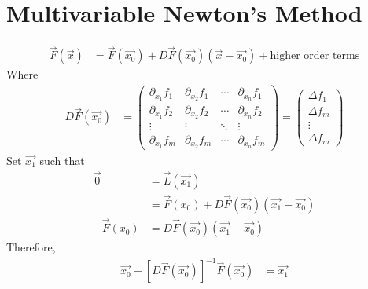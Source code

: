\documentclass[11pt,oneside]{book}
\theoremstyle{break}
\theoremstyle{break}
\begin{document}
\section[Multivariable Newton's Method]{Multivariable  Newton's Method}
\begin{align*}
\vec{F}(\vec{x})&=\vec{F}(\vec{x_0})+D\vec{F}(\vec{x_0})(\vec{x}-\vec{x_0})+\text{higher order terms}
\end{align*}
Where \begin{align*}
D\vec{F}(\vec{x_0})&=\begin{pmatrix}
\partial_{x_1}f_1& \partial_{x_2}f_1&\cdots &\partial_{x_n}f_1\\
\partial_{x_1}f_2& \partial_{x_2}f_2&\cdots &\partial_{x_n}f_2\\
\vdots &\vdots &\ddots &\vdots\\
\partial_{x_1}f_m& \partial_{x_2}f_m&\cdots &\partial_{x_n}f_m
\end{pmatrix}=\begin{pmatrix}
\Delta f_1\\
\Delta f_m\\
\vdots\\
\Delta f_m
\end{pmatrix}
\end{align*}
Set $\vec{x_1}$ such that \begin{align*}
\vec{0}&=\vec{L}(\vec{x_1})\\
&=\vec{F}(x_0)+D\vec{F}(\vec{x_0})(\vec{x_1}-\vec{x_0})\\
-\vec{F}(x_0)&=D\vec{F}(\vec{x_0})(\vec{x_1}-\vec{x_0})
\end{align*}
Therefore, \begin{align*}
\vec{x_0}-[D\vec{F}(\vec{x_0})]^{-1}\vec{F}(\vec{x_0})&=\vec{x_1}
\end{align*}
\end{document}
